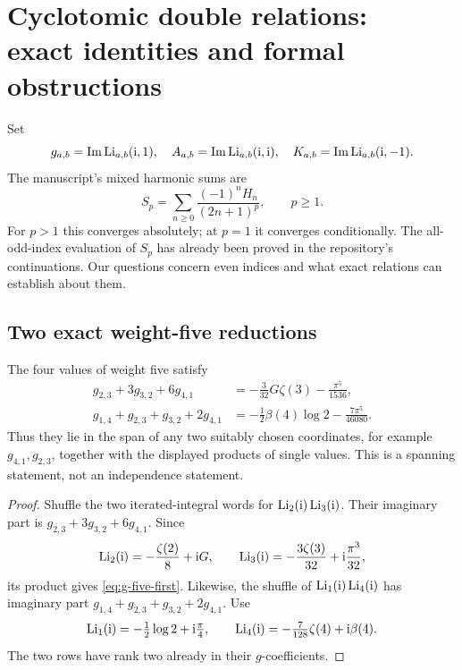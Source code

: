 \section[Cyclotomic double relations: exact identities and formal obstructions]{Cyclotomic double relations:\\exact identities and formal obstructions}
\label{sec:gaussian}

Set
\[
 g_{a,b}=\operatorname{Im}\operatorname{Li}_{a,b}(\mathrm{i},1),\quad
 A_{a,b}=\operatorname{Im}\operatorname{Li}_{a,b}(\mathrm{i},\mathrm{i}),\quad
 K_{a,b}=\operatorname{Im}\operatorname{Li}_{a,b}(\mathrm{i},-1).
\]
The manuscript's mixed harmonic sums are
\[
 S_p=\sum_{n\geq0}\frac{(-1)^nH_n}{(2n+1)^p},\qquad p\geq1.
\]
For \(p>1\) this converges absolutely; at \(p=1\) it converges
conditionally. The all-odd-index evaluation of \(S_p\) has already
been proved in the repository's continuations. Our questions concern
even indices and what exact relations can establish about them.

\subsection{Two exact weight-five reductions}

\begin{proposition}
\label{prop:two-g}
The four values of weight five satisfy
\begin{align}
 g_{2,3}+3g_{3,2}+6g_{4,1}
   &=-\frac3{32}G\zeta(3)-\frac{\pi^5}{1536},
     \label{eq:g-five-first}\\
 g_{1,4}+g_{2,3}+g_{3,2}+2g_{4,1}
   &=-\frac12\beta(4)\log2-\frac{7\pi^5}{46080}.
     \label{eq:g-five-second}
\end{align}
Thus they lie in the span of any two suitably chosen coordinates,
for example \(g_{4,1},g_{2,3}\), together with the displayed products
of single values. This is a spanning statement, not an independence
statement.
\end{proposition}

\begin{proof}
Shuffle the two iterated-integral words for
\(\operatorname{Li}_2(\mathrm{i})\operatorname{Li}_3(\mathrm{i})\). Their imaginary part is
\(g_{2,3}+3g_{3,2}+6g_{4,1}\).
Since
\[
 \operatorname{Li}_2(\mathrm{i})=-\frac{\zeta(2)}8+\mathrm{i} G,\qquad
 \operatorname{Li}_3(\mathrm{i})=-\frac{3\zeta(3)}{32}+\mathrm{i}\frac{\pi^3}{32},
\]
its product gives \eqref{eq:g-five-first}.
Likewise, the shuffle of \(\operatorname{Li}_1(\mathrm{i})\operatorname{Li}_4(\mathrm{i})\) has imaginary part
\(g_{1,4}+g_{2,3}+g_{3,2}+2g_{4,1}\). Use
\[
 \operatorname{Li}_1(\mathrm{i})=-\tfrac12\log2+\mathrm{i}\tfrac\pi4,\qquad
 \operatorname{Li}_4(\mathrm{i})=-\tfrac7{128}\zeta(4)+\mathrm{i}\beta(4).
\]
The two rows have rank two already in their \(g\)-coefficients.
\end{proof}

